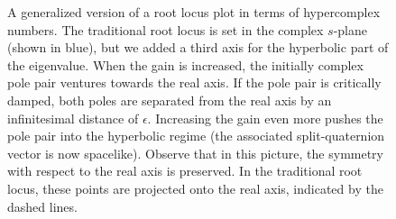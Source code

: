 \begin{figure}[ht]
    \centering
    
    \caption{A generalized version of a root locus plot in terms of hypercomplex numbers. The traditional root locus is set in the complex \(s\)-plane (shown in blue), but we added a third axis for the hyperbolic part of the eigenvalue. When the gain is increased, the initially complex pole pair ventures towards the real axis. If the pole pair is critically damped, both poles are separated from the real axis by an infinitesimal distance of \(\epsilon\). Increasing the gain even more pushes the pole pair into the hyperbolic regime (the associated split-quaternion vector is now spacelike). Observe that in this picture, the symmetry with respect to the real axis is preserved. In the traditional root locus, these points are projected onto the real axis, indicated by the dashed lines. }
    \label{fig:root_locus}
\end{figure}

